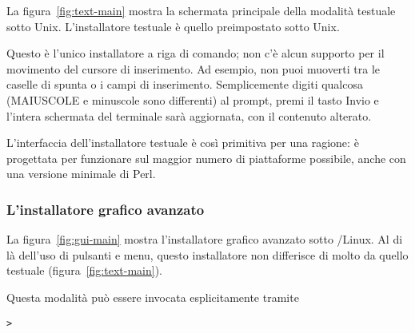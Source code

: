 \documentclass{article}
\begin{document}
La figura~\ref{fig:text-main} mostra la schermata principale della
modalità testuale sotto Unix. L'installatore testuale è quello
preimpostato sotto Unix.

Questo è l'unico installatore a riga di comando; non c'è alcun supporto
per il movimento del cursore di inserimento. Ad esempio, non puoi muoverti
tra le caselle di spunta o i campi di inserimento. Semplicemente digiti
qualcosa (MAIUSCOLE e minuscole sono differenti) al prompt, premi il
tasto Invio e l'intera schermata del terminale sarà aggiornata, con il
contenuto alterato.

L'interfaccia dell'installatore testuale è così primitiva per una ragione:
è progettata per funzionare sul maggior numero di piattaforme possibile,
anche con una versione minimale di Perl.

\subsubsection{L'installatore grafico avanzato}

La figura~\ref{fig:gui-main} mostra l'installatore grafico avanzato sotto
\GNU/Linux. Al di là dell'uso di pulsanti e menu, questo installatore non
differisce di molto da quello testuale (figura~\ref{fig:text-main}).

Questa modalità può essere invocata esplicitamente tramite
\begin{alltt}
> 
\end{alltt}
\end{document}

